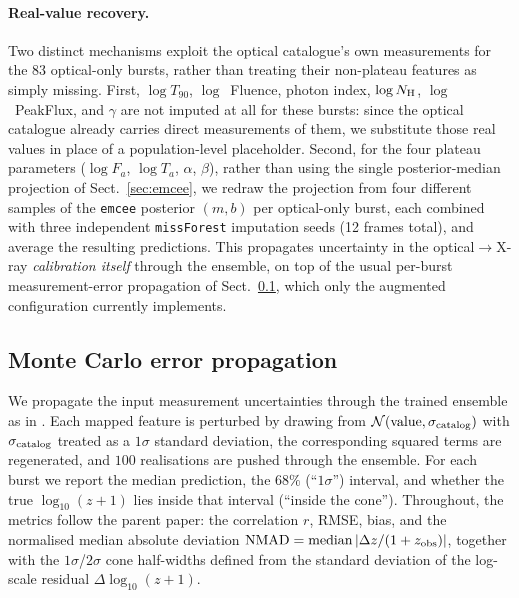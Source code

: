 \documentclass{aa}
\newcommand{\Fa}{F_a}
\newcommand{\Ta}{T_a}
\newcommand{\NH}{N_{\rm H}}
\newcommand{\logz}{\log_{10}(z+1)}
\begin{document}
\paragraph{Real-value recovery.} Two distinct mechanisms exploit the optical
catalogue's own measurements for the 83 optical-only bursts, rather than treating
their non-plateau features as simply missing. First, $\log T_{90}$,
$\log$~Fluence, photon index, $\log \NH$, $\log$~PeakFlux, and $\gamma$ are not
imputed at all for these bursts: since the optical catalogue already carries direct
measurements of them, we substitute those real values in place of a population-level
placeholder. Second, for the four plateau parameters ($\log \Fa$, $\log \Ta$,
$\alpha$, $\beta$), rather than using the single posterior-median projection of
Sect.~\ref{sec:emcee}, we redraw the projection from four different samples of the
\texttt{emcee} posterior $(m,b)$ per optical-only burst, each combined with three
independent \texttt{missForest} imputation seeds (12 frames total), and average the
resulting predictions. This propagates uncertainty in the optical$\rightarrow$X-ray
\emph{calibration itself} through the ensemble, on top of the usual per-burst
measurement-error propagation of Sect.~\ref{sec:mc}, which only the augmented
configuration currently implements.

\subsection{Monte Carlo error propagation}
\label{sec:mc}

We propagate the input measurement uncertainties through the trained ensemble as in
\citet[Sect.~4.7]{narendra2025}. Each mapped feature is perturbed by drawing from
$\mathcal{N}(\mathrm{value}, \sigma_{\rm catalog})$ with $\sigma_{\rm catalog}$
treated as a $1\sigma$ standard deviation, the corresponding squared terms are
regenerated, and $100$ realisations are pushed through the ensemble. For each burst
we report the median prediction, the $68\%$ (``$1\sigma$'') interval, and whether the
true $\logz$ lies inside that interval (``inside the cone''). Throughout, the metrics
follow the parent paper: the correlation $r$, RMSE, bias, and the normalised median
absolute deviation ${\rm NMAD}=\mathrm{median}\,|\Delta z/(1+z_{\rm obs})|$, together
with the $1\sigma$/$2\sigma$ cone half-widths defined from the standard deviation of
the log-scale residual $\Delta\logz$.

\end{document}
